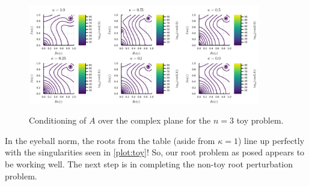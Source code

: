 \documentclass[a4paper,11pt]{article}
\begin{document}
\begin{figure}[t]
	\centering
	\captionsetup{width = 0.9\textwidth}
	\caption{Conditioning of $ A $ over the complex plane for the $ n = 3 $ toy problem.}
	\includegraphics[width=0.9\textwidth]{Images/Toy_Conditioning.png}
	\label{plot:toy}
\end{figure}

In the eyeball norm, the roots from the table (aside from $ \kappa = 1 $) line up perfectly with the singularities seen in \autoref{plot:toy}! So, our root problem as posed appears to be working well. The next step is in completing the non-toy root perturbation problem.

\newpage


\end{document}
